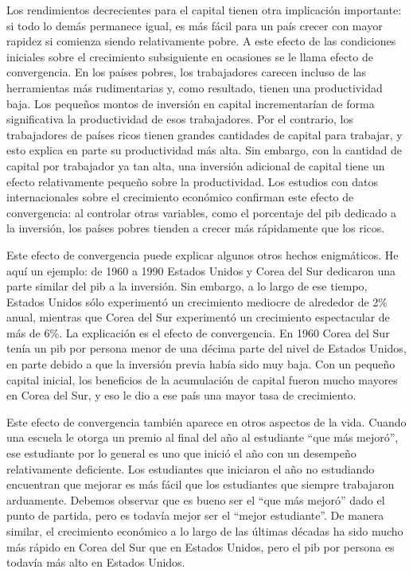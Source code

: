 \documentclass[
]{krantz}
\begin{document}
Los rendimientos decrecientes para el capital tienen otra implicación importante: si todo lo demás permanece igual, es más fácil para un país crecer con mayor rapidez si comienza siendo relativamente pobre. A este efecto de las condiciones iniciales sobre el crecimiento subsiguiente en ocasiones se le llama efecto de convergencia. En los países pobres, los trabajadores carecen incluso de las herramientas más rudimentarias y, como resultado, tienen una productividad baja. Los pequeños montos de inversión en capital incrementarían de forma significativa la productividad de esos trabajadores. Por el contrario, los trabajadores de países ricos tienen grandes cantidades de capital para trabajar, y esto explica en parte su productividad más alta. Sin embargo, con la cantidad de capital por trabajador ya tan alta, una inversión adicional de capital tiene un efecto relativamente pequeño sobre la productividad. Los estudios con datos internacionales sobre el crecimiento económico confirman este efecto de convergencia: al controlar otras variables, como el porcentaje del pib dedicado a la inversión, los países pobres tienden a crecer más rápidamente que los ricos.

Este efecto de convergencia puede explicar algunos otros hechos enigmáticos. He aquí un ejemplo: de 1960 a 1990 Estados Unidos y Corea del Sur dedicaron una parte similar del pib a la inversión. Sin embargo, a lo largo de ese tiempo, Estados Unidos sólo experimentó un crecimiento mediocre de alrededor de 2\% anual, mientras que Corea del Sur experimentó un crecimiento espectacular de más de 6\%. La explicación es el efecto de convergencia. En 1960 Corea del Sur tenía un pib por persona menor de una décima parte del nivel de Estados Unidos, en parte debido a que la inversión previa había sido muy baja. Con un pequeño capital inicial, los beneficios de la acumulación de capital fueron mucho mayores en Corea del Sur, y eso le dio a ese país una mayor tasa de crecimiento.

Este efecto de convergencia también aparece en otros aspectos de la vida. Cuando una escuela le otorga un premio al final del año al estudiante ``que más mejoró'', ese estudiante por lo general es uno que inició el año con un desempeño relativamente deficiente. Los estudiantes que iniciaron el año no estudiando encuentran que mejorar es más fácil que los estudiantes que siempre trabajaron arduamente. Debemos observar que es bueno ser el ``que más mejoró'' dado el punto de partida, pero es todavía mejor ser el ``mejor estudiante''. De manera similar, el crecimiento económico a lo largo de las últimas décadas ha sido mucho más rápido en Corea del Sur que en Estados Unidos, pero el pib por persona es todavía más alto en Estados Unidos.
\end{document}
